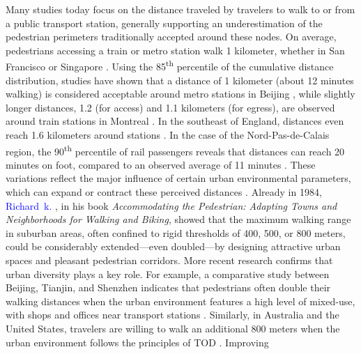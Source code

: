 \begin{refsegment}
Many studies today focus on the distance traveled by travelers to walk to or from a public transport station, generally supporting an underestimation of the pedestrian perimeters traditionally accepted around these nodes. On average, pedestrians accessing a train or metro station walk 1 kilometer, whether in San Francisco \textcolor{blue}{\autocite[5]{cervero_walk-and-ride_2001}} or Singapore \textcolor{blue}{\autocite[41]{olszewski_using_2005}}. Using the 85\textsuperscript{th} percentile of the cumulative distance distribution, studies have shown that a distance of 1 kilometer (about 12 minutes walking) is considered acceptable around metro stations in Beijing \textcolor{blue}{\autocite[720]{yang_study_2013}}, while slightly longer distances, 1.2 (for access) and 1.1 kilometers (for egress), are observed around train stations in Montreal \textcolor{blue}{\autocite[9]{el-geneidy_pedestrian_2009}}. In the southeast of England, distances even reach 1.6 kilometers around stations \textcolor{blue}{\autocite[14]{bunn_how_2015}}. In the case of the Nord-Pas-de-Calais region, the 90\textsuperscript{th} percentile of rail passengers reveals that distances can reach 20 minutes on foot, compared to an observed average of 11 minutes \textcolor{blue}{\autocite[17]{hasiak_estimation_2018}}. These variations reflect the major influence of certain urban environmental parameters, which can expand or contract these perceived distances \textcolor{blue}{\autocite[17]{soest_exploring_2020}}. Already in 1984, \textcolor{blue}{Richard~k.} \textcolor{blue}{\textcite[23-59]{untermann_accommodating_1984}}, in his book \foreignlanguage{english}{\textsl{Accommodating the Pedestrian: Adapting Towns and Neighborhoods for Walking and Biking}}, showed that the maximum walking range in suburban areas, often confined to rigid thresholds of 400, 500, or 800 meters, could be considerably extended—even doubled—by designing attractive urban spaces and pleasant pedestrian corridors. More recent research confirms that urban diversity plays a key role. For example, a comparative study between Beijing, Tianjin, and Shenzhen indicates that pedestrians often double their walking distances when the urban environment features a high level of mixed-use, with shops and offices near transport stations \textcolor{blue}{\autocite[12]{zacharias_local_2017}}. Similarly, in Australia and the United States, travelers are willing to walk an additional 800 meters when the urban environment follows the principles of \acrshort{TOD} \textcolor{blue}{\autocite[33]{canepa_bursting_2007}}. Improving 
\end{refsegment}
